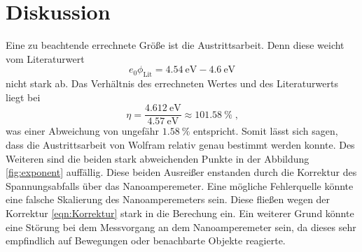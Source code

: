 \section{Diskussion}
\label{sec:Diskussion}
Eine zu beachtende errechnete Größe ist die Austrittsarbeit. Denn diese weicht vom Literaturwert\cite{lit}
\begin{equation*}
    e_0\phi_\text{Lit} =  \SI{4.54}{\electronvolt} - \SI{4.6}{\electronvolt}
\end{equation*}
nicht stark ab. Das Verhältnis des errechneten Wertes und des Literaturwerts liegt bei
\begin{equation*}
    \eta = \frac{\SI{4.612}{\electronvolt}}{\SI{4.57}{\electronvolt}} \approx \SI{101.58}{\percent} \; \text{,}
\end{equation*}
was einer Abweichung von ungefähr $\SI{1.58}{\percent}$ entspricht.
Somit lässt sich sagen, dass die Austrittsarbeit von Wolfram relativ genau bestimmt werden konnte.
Des Weiteren sind die beiden stark abweichenden Punkte in der Abbildung \ref{fig:exponent} auffällig. 
Diese beiden Ausreißer enstanden durch die Korrektur des Spannungsabfalls über das Nanoamperemeter.
Eine mögliche Fehlerquelle könnte eine falsche Skalierung des Nanoamperemeters sein. 
Diese fließen wegen der Korrektur \eqref{eqn:Korrektur} stark in die Berechung ein.
Ein weiterer Grund könnte eine Störung bei dem Messvorgang an dem Nanoamperemeter sein, da dieses sehr empfindlich auf Bewegungen oder 
benachbarte Objekte reagierte.
